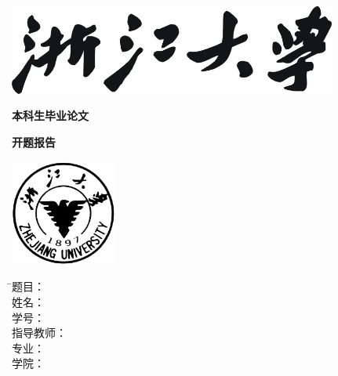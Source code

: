 
\thispagestyle{empty}

\vspace{5mm}

\begin{center}
   \includegraphics[width=108mm]{images/zjdx}
\end{center}

\centerline{\heiti\erhao\textbf{本科生毕业论文}}
\centerline{\heiti\erhao\textbf{开题报告}}
\vspace{4mm}

\begin{center}
  \includegraphics[width=35mm]{images/standxb}
\end{center}

\vspace{25mm}


\vspace{7mm}

\begin{tabbing}
     \= \songti\sihao 题\hspace{10mm}目： \= \underline{\makebox[12cm]{\sihao\zjutitlec}} \\[2mm]
    \> \songti\sihao 姓\hspace{10mm}名： \= \underline{\makebox[12cm]{\sihao\zjuauthornamec}} \\[2mm]
    \> \songti\sihao 学\hspace{10mm}号： \> 
    \underline{\makebox[12cm]{\sihao\zjuauthorid}} \\[2mm]
    \> \songti\sihao 指导教师： \> \underline{\makebox[12cm]{\sihao\zjumentorc}} \\[2mm]
    \> \songti\sihao 专\hspace{10mm}业： \= \underline{\makebox[12cm]{\sihao\zjugrade\hspace{3mm}\zjumajor}} \\[2mm]
    \> \songti\sihao 学\hspace{10mm}院： \> \underline{\makebox[12cm]{\sihao\zjucollegec}}
\end{tabbing}


